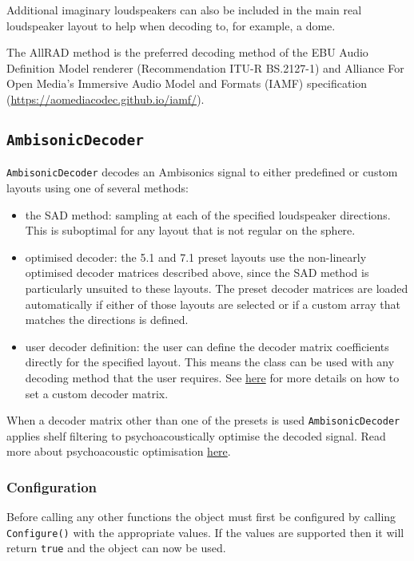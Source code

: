 \documentclass[12pt]{report}
\newcommand{\code}[1]{\texttt{#1}}
\begin{document}
Additional imaginary loudspeakers can also be included in the main real loudspeaker layout to help when decoding to, for example, a dome.

The AllRAD method is the preferred decoding method of the EBU Audio Definition Model renderer (Recommendation ITU-R BS.2127-1) and Alliance For Open Media's Immersive Audio Model and Formats (IAMF) specification (\href{https://aomediacodec.github.io/iamf/}{https://aomediacodec.github.io/iamf/}).

\subsection{\code{AmbisonicDecoder}}\label{AmbisonicDecoder}

\code{AmbisonicDecoder} decodes an Ambisonics signal to either predefined or custom layouts using one of several methods:

\begin{itemize}
    \item the SAD method: sampling at each of the specified loudspeaker directions. This is suboptimal for any layout that is not regular on the sphere.
    \item optimised decoder: the 5.1 and 7.1 preset layouts use the non-linearly optimised decoder matrices described above, since the SAD method is particularly unsuited to these layouts. The preset decoder matrices are loaded automatically if either of those layouts are selected or if a custom array that matches the directions is defined.
    \item user decoder definition: the user can define the decoder matrix coefficients directly for the specified layout. This means the class can be used with any decoding method that the user requires. See \href{#cambisonicdecoder-set-custom-decoder-coefficients}{here} for more details on how to set a custom decoder matrix.
\end{itemize}

When a decoder matrix other than one of the presets is used \code{AmbisonicDecoder} applies shelf filtering to psychoacoustically optimise the decoded signal. Read more about psychoacoustic optimisation \href{AmbisonicOptimisation.md}{here}.

\subsubsection{Configuration}

Before calling any other functions the object must first be configured by calling \code{Configure()} with the appropriate values. If the values are supported then it will return \code{true} and the object can now be used.
\end{document}
